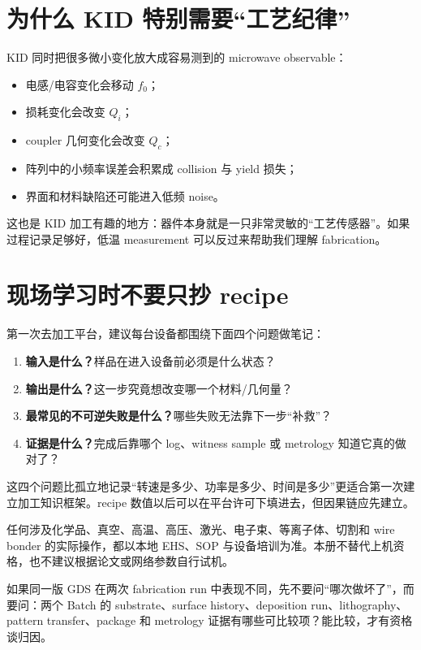 \section{为什么 KID 特别需要“工艺纪律”}

KID 同时把很多微小变化放大成容易测到的 microwave observable：

\begin{itemize}
  \item 电感/电容变化会移动 $f_0$；
  \item 损耗变化会改变 $Q_i$；
  \item coupler 几何变化会改变 $Q_c$；
  \item 阵列中的小频率误差会积累成 collision 与 yield 损失；
  \item 界面和材料缺陷还可能进入低频 noise。
\end{itemize}

这也是 KID 加工有趣的地方：器件本身就是一只非常灵敏的“工艺传感器”。如果过程记录足够好，低温 measurement 可以反过来帮助我们理解 fabrication。

\section{现场学习时不要只抄 recipe}

第一次去加工平台，建议每台设备都围绕下面四个问题做笔记：

\begin{enumerate}
  \item \textbf{输入是什么？}样品在进入设备前必须是什么状态？
  \item \textbf{输出是什么？}这一步究竟想改变哪一个材料/几何量？
  \item \textbf{最常见的不可逆失败是什么？}哪些失败无法靠下一步“补救”？
  \item \textbf{证据是什么？}完成后靠哪个 log、witness sample 或 metrology 知道它真的做对了？
\end{enumerate}

这四个问题比孤立地记录“转速是多少、功率是多少、时间是多少”更适合第一次建立加工知识框架。recipe 数值以后可以在平台许可下填进去，但因果链应先建立。

\begin{warningbox}
任何涉及化学品、真空、高温、高压、激光、电子束、等离子体、切割和 wire bonder 的实际操作，都以本地 EHS、SOP 与设备培训为准。本册不替代上机资格，也不建议根据论文或网络参数自行试机。
\end{warningbox}

\begin{checkpointbox}
如果同一版 GDS 在两次 fabrication run 中表现不同，先不要问“哪次做坏了”，而要问：两个 Batch 的 substrate、surface history、deposition run、lithography、pattern transfer、package 和 metrology 证据有哪些可比较项？能比较，才有资格谈归因。
\end{checkpointbox}
